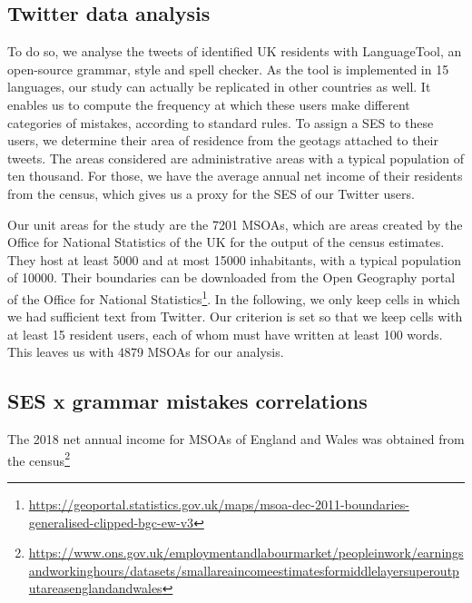 \documentclass[../thesis.tex]{subfiles}
\begin{document}
\subsection{Twitter data analysis}
To do so, we analyse the tweets of identified UK residents with LanguageTool, an
open-source grammar, style and spell checker. As the tool is implemented in 15
languages, our study can actually be replicated in other countries as well. It enables
us to compute the frequency at which these users make different categories of mistakes,
according to standard rules. To assign a \ac{SES} to these users, we determine their
area of residence from the geotags attached to their tweets. The areas considered are
administrative areas with a typical population of ten thousand. For those, we have the
average annual net income of their residents from the census, which gives us a proxy for
the \ac{SES} of our Twitter users.

Our unit areas for the study are the \SI{7201}{} \acp{MSOA}, which are areas created by
the Office for National Statistics of the UK for the output of the census estimates.
They host at least \SI{5000}{} and at most \SI{15000}{} inhabitants, with a typical
population of \SI{10000}{}. Their boundaries can be downloaded from the Open Geography
portal of the Office for National
Statistics\footnote{\url{https://geoportal.statistics.gov.uk/maps/msoa-dec-2011-boundaries-generalised-clipped-bgc-ew-v3}}.
In the following, we only keep cells in which we had sufficient text from Twitter. Our
criterion is set so that we keep cells with at least 15 resident users, each of whom
must have written at least 100 words. This leaves us with \SI{4879}{} \acp{MSOA} for our
analysis.


\subsection{SES x grammar mistakes correlations}
The 2018 net annual income for \acp{MSOA} of England and Wales was obtained from the
census\footnote{\url{https://www.ons.gov.uk/employmentandlabourmarket/peopleinwork/earningsandworkinghours/datasets/smallareaincomeestimatesformiddlelayersuperoutputareasenglandandwales}}
\end{document}
